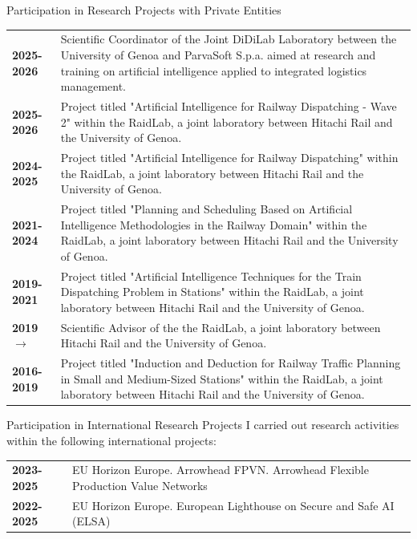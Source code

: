 \documentclass{resume} %
\begin{document}
\begin{rSection}{Participation in Research Projects with Private Entities}
	\begin{tabularx}{0.95\textwidth} {lp{14cm}}
 	\textbf{2025-2026} & Scientific Coordinator of the Joint DiDiLab Laboratory between the University of Genoa and ParvaSoft S.p.a. aimed at research and training on artificial intelligence applied to integrated logistics management. \\
 	\textbf{2025-2026} & Project titled "Artificial Intelligence for Railway Dispatching - Wave 2" within the RaidLab, a joint laboratory between Hitachi Rail and the University of Genoa. \\
 	\textbf{2024-2025} & Project titled "Artificial Intelligence for Railway Dispatching" within the RaidLab, a joint laboratory between Hitachi Rail and the University of Genoa. \\
  	\textbf{2021-2024} & Project titled "Planning and Scheduling Based on Artificial Intelligence Methodologies in the Railway Domain" within the RaidLab, a joint laboratory between Hitachi Rail and the University of Genoa. \\
   	\textbf{2019-2021} & Project titled "Artificial Intelligence Techniques for the Train Dispatching Problem in Stations" within the RaidLab, a joint laboratory between Hitachi Rail and the University of Genoa.\\
 		\textbf{2019$\rightarrow$} & Scientific Advisor of the the RaidLab, a joint laboratory between Hitachi Rail and the University of Genoa. \\
    \textbf{2016-2019} & Project titled "Induction and Deduction for Railway Traffic Planning in Small and Medium-Sized Stations" within the RaidLab, a joint laboratory between Hitachi Rail and the University of Genoa.\\
 \end{tabularx}
\end{rSection}

\break
\begin{rSection}{Participation in International Research Projects}
I carried out research activities within the following international projects:\\
	\begin{tabularx}{0.95\textwidth} {lp{14cm}}
 \textbf{2023-2025} & EU Horizon Europe. Arrowhead FPVN. Arrowhead Flexible Production Value Networks \\
 \textbf{2022-2025} & EU Horizon Europe. European Lighthouse on Secure and Safe AI (ELSA)
 \end{tabularx}
\end{rSection}
\end{document}
